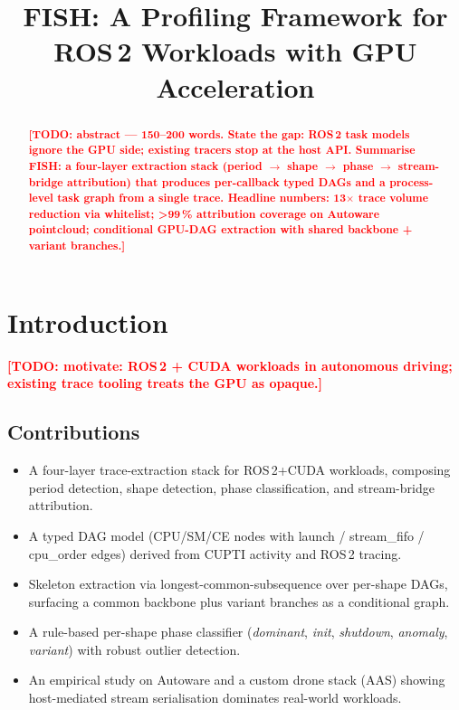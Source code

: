 \documentclass[conference]{IEEEtran}
\newcommand{\todoit}[1]{\textcolor{red}{\textbf{[TODO: #1]}}}
\begin{document}
\title{FISH: A Profiling Framework for ROS\,2 Workloads with GPU Acceleration}

\author{
}

\maketitle

\begin{abstract}
\todoit{abstract — 150--200 words. State the gap: ROS\,2 task models
ignore the GPU side; existing tracers stop at the host API. Summarise
FISH: a four-layer extraction stack (period $\to$ shape $\to$ phase
$\to$ stream-bridge attribution) that produces per-callback typed DAGs
and a process-level task graph from a single trace. Headline numbers:
13$\times$ trace volume reduction via whitelist; \textgreater 99\,\%
attribution coverage on Autoware pointcloud; conditional GPU-DAG
extraction with shared backbone + variant branches.}
\end{abstract}

\section{Introduction}
\todoit{motivate: ROS\,2 + CUDA workloads in autonomous driving;
existing trace tooling treats the GPU as opaque.}

\subsection{Contributions}
\begin{itemize}
  \item A four-layer trace-extraction stack for ROS\,2+CUDA workloads,
        composing period detection, shape detection, phase classification,
        and stream-bridge attribution.
  \item A typed DAG model (CPU/SM/CE nodes with launch / stream\_fifo /
        cpu\_order edges) derived from CUPTI activity and ROS\,2 tracing.
  \item Skeleton extraction via longest-common-subsequence over per-shape
        DAGs, surfacing a common backbone plus variant branches as
        a conditional graph.
  \item A rule-based per-shape phase classifier
        (\textit{dominant}, \textit{init}, \textit{shutdown}, \textit{anomaly},
        \textit{variant}) with robust outlier detection.
  \item An empirical study on Autoware and a custom drone stack (AAS)
        showing host-mediated stream serialisation dominates real-world
        workloads.
\end{itemize}
\end{document}
